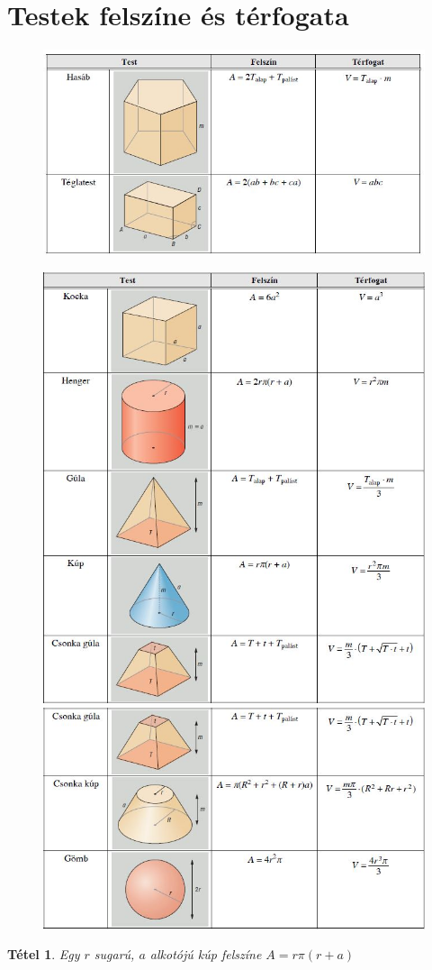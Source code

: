 \documentclass[twoside,12pt]{report}
\newtheorem{theorem}{Tétel}[section]
\theoremstyle{definition}
\begin{document}
\section{Testek felszíne és térfogata}
	\begin{figure}[H]
		\centering
		\includegraphics[width=.8\linewidth]{Test1}
	\end{figure}
	\begin{figure}[H]
		\centering
		\includegraphics[width=.8\linewidth]{Test2}
		\includegraphics[width=.8\linewidth]{Test3}
	\end{figure}
	\begin{theorem}
		Egy $r$ sugarú, $a$ alkotójú kúp felszíne $A=r\pi(r+a)$
	\end{theorem}
\end{document}
